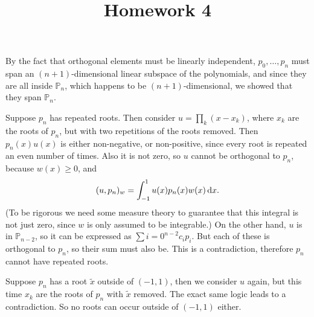 \documentclass{homework}
\title{Homework 4}
\begin{document}
\maketitle

\begin{problem}
By the fact that orthogonal elements must be linearly independent, \(p_0, \dots, p_n\) must span an \((n+1)\)-dimensional linear subspace of the polynomials, and since they are all inside \(\mathbb P_n\), which happens to be \((n+1)\)-dimensional, we showed that they span \(\mathbb P_n\).

Suppose \(p_n\) has repeated roots. Then consider \(u = \prod_k (x-x_k)\), where \(x_k\) are the roots of \(p_n\), but with two repetitions of the roots removed. Then \(p_n(x)u(x)\) is either non-negative, or non-positive, since every root is repeated an even number of times. Also it is not zero, so \(u\) cannot be orthogonal to \(p_n\), because \(w(x) \ge 0\), and
\[(u, p_n)_w = \int_{-1}^1 u(x) p_n(x) w(x) \d[x].\]
(To be rigorous we need some measure theory to guarantee that this integral is not just zero, since \(w\) is only assumed to be integrable.)
On the other hand, \(u\) is in \(\mathbb P_{n-2}\), so it can be expressed as \(\sum{i=0}^{n-2} c_i p_i\). But each of these is orthogonal to \(p_n\), so their sum must also be. This is a contradiction, therefore \(p_n\) cannot have repeated roots.

Suppose \(p_n\) has a root \(\tilde x\) outside of \((-1,1)\), then we consider \(u\) again, but this time \(x_k\) are the roots of \(p_n\) with \(\tilde x\) removed. The exact same logic leads to a contradiction. So no roots can occur outside of \((-1,1)\) either.
\end{problem}
\end{document}
